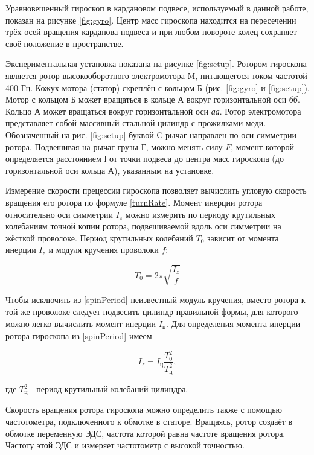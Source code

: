 \documentclass[a4paper,12pt]{article} %
\begin{document}
Уравновешенный гироскоп в кардановом подвесе, используемый в данной работе, показан на рисунке \ref{fig:gyro}. Центр масс гироскопа находится на пересечении трёх осей вращения карданова подвеса и при любом повороте колец сохраняет своё положение в пространстве.

Экспериментальная установка показана на рисунке \ref{fig:setup}. Ротором гироскопа является ротор высокооборотного электромотора M, питающегося током частотой 400 Гц. Кожух мотора (статор) скреплён с кольцом Б (рис. \ref{fig:gyro} и \ref{fig:setup}). Мотор с кольцом Б может вращаться в кольце А вокруг горизонтальной оси \textit{бб}. Кольцо А может вращаться вокруг горизонтальной оси \textit{аа}. Ротор электромотора представляет собой массивный стальной цилиндр с прожилками меди. Обозначенный на рис. \ref{fig:setup} буквой C рычаг направлен по оси симметрии ротора. Подвешивая на рычаг грузы Г, можно менять силу $ F $, момент которой определяется расстоянием l от точки подвеса до центра масс гироскопа (до горизонтальной оси кольца А), указанным на установке.

Измерение скорости прецессии гироскопа позволяет вычислить угловую скорость вращения его ротора по формуле \eqref{turnRate}. Момент инерции ротора относительно оси симметрии $ I_z $ можно измерить по периоду крутильных колебаниям точной копии ротора, подвешиваемой вдоль оси симметрии на жёсткой проволоке. Период крутильных колебаний $ T_0 $ зависит от момента инерции $ I_z $ и модуля кручения проволоки $ f $:

\begin{equation}
    T_0 = 2\pi\sqrt{\frac{I_z}{f}}
    \label{spinPeriod}
\end{equation}

Чтобы исключить из \eqref{spinPeriod} неизвестный модуль кручения, вместо ротора к той же проволоке следует подвесить цилиндр правильной формы, для которого можно легко вычислить момент инерции $ I_\text{ц} $. Для определения момента инерции ротора гироскопа из \eqref{spinPeriod} имеем

\begin{equation}
    I_z = I_\text{ц} \frac{T_0^2}{T_\text{ц}^2},
    \label{inertiaMoment}
\end{equation}

где $ T_\text{ц}^2 $ - период крутильный колебаний цилиндра. 

Скорость вращения ротора гироскопа можно определить также с помощью частотометра, подключенного к обмотке в статоре. Вращаясь, ротор создаёт в обмотке переменную ЭДС, частота которой равна частоте вращения ротора. Частоту этой ЭДС и измеряет частотометр с высокой точностью. 
\end{document}
